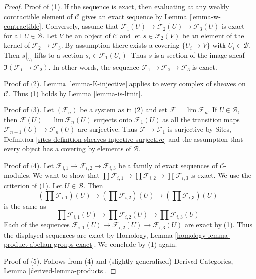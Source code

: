 \begin{proof}
Proof of (1). If the sequence is exact, then evaluating at any
weakly contractible element of $\mathcal{C}$ gives an exact
sequence by Lemma \ref{lemma-w-contractible}. Conversely, assume that
$\mathcal{F}_1(U) \to \mathcal{F}_2(U) \to \mathcal{F}_3(U)$
is exact for all $U \in \mathcal{B}$.
Let $V$ be an object of $\mathcal{C}$ and let
$s \in \mathcal{F}_2(V)$ be an element of the kernel of
$\mathcal{F}_2 \to \mathcal{F}_3$. By assumption there exists
a covering $\{U_i \to V\}$ with $U_i \in \mathcal{B}$.
Then $s|_{U_i}$ lifts to a section $s_i \in \mathcal{F}_1(U_i)$.
Thus $s$ is a section of the image sheaf
$\Im(\mathcal{F}_1 \to \mathcal{F}_2)$.
In other words, the sequence
$\mathcal{F}_1 \to \mathcal{F}_2 \to \mathcal{F}_3$
is exact.

\medskip\noindent
Proof of (2). Lemma \ref{lemma-K-injective} applies to every complex of
sheaves on $\mathcal{C}$. Thus (1) holds by Lemma \ref{lemma-is-limit}.

\medskip\noindent
Proof of (3). Let $(\mathcal{F}_n)$ be a system as in (2) and set
$\mathcal{F} = \lim \mathcal{F}_n$. If $U \in \mathcal{B}$, then
$\mathcal{F}(U) = \lim \mathcal{F}_n(U)$
surjects onto $\mathcal{F}_1(U)$ as all the transition maps
$\mathcal{F}_{n + 1}(U) \to \mathcal{F}_n(U)$ are surjective.
Thus $\mathcal{F} \to \mathcal{F}_1$ is surjective by
Sites, Definition \ref{sites-definition-sheaves-injective-surjective}
and the assumption that every object
has a covering by elements of $\mathcal{B}$.

\medskip\noindent
Proof of (4). Let
$\mathcal{F}_{i, 1} \to \mathcal{F}_{i, 2} \to \mathcal{F}_{i, 3}$
be a family of exact sequences of $\mathcal{O}$-modules.
We want to show that
$\prod \mathcal{F}_{i, 1} \to \prod \mathcal{F}_{i, 2} \to
\prod \mathcal{F}_{i, 3}$ is exact. We use the criterion of (1).
Let $U \in \mathcal{B}$. Then
$$
(\prod \mathcal{F}_{i, 1})(U) \to
(\prod \mathcal{F}_{i, 2})(U) \to
(\prod \mathcal{F}_{i, 3})(U)
$$
is the same as
$$
\prod \mathcal{F}_{i, 1}(U) \to
\prod \mathcal{F}_{i, 2}(U) \to
\prod \mathcal{F}_{i, 3}(U)
$$
Each of the sequences
$\mathcal{F}_{i, 1}(U) \to \mathcal{F}_{i, 2}(U) \to \mathcal{F}_{i, 3}(U)$
are exact by (1). Thus the displayed sequences are exact by
Homology, Lemma \ref{homology-lemma-product-abelian-groups-exact}.
We conclude by (1) again.

\medskip\noindent
Proof of (5). Follows from (4) and (slightly generalized)
Derived Categories, Lemma \ref{derived-lemma-products}.


\end{proof}

